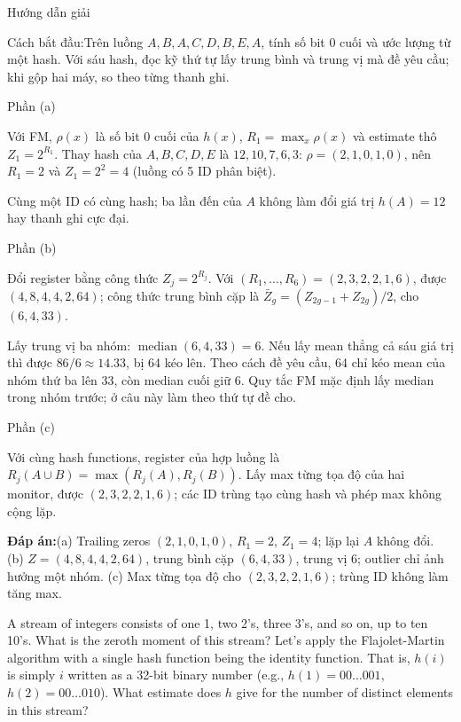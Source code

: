 \documentclass[10pt,a4paper,twocolumn]{article}
\makeatletter
\newcommand{\maptag}[1]{\phantomsection\@bsphack\protected@write\@auxout{}{\string\newlabel{#1}{{}{\thepage}{}{\@currentHref}{}}}\@esphack}
\newcommand{\key}[1]{#1:\enspace}
\newcommand{\solutionprompt}[1]{\par\addvspace{1pt}\noindent\key{Cách bắt đầu}#1\par\addvspace{2pt}}
\newcommand{\blocklabel}[1]{\par\noindent#1\par\nobreak}
\newcommand{\answer}[1]{%
  \par\addvspace{3pt}%
  \blocklabel{#1Hướng dẫn giải}}
\newcommand{\finalanswer}[1]{%
  \par\addvspace{3pt}\noindent\textbf{Đáp án:}\nobreak\enspace#1\par}
\newcommand{\guidepart}[1]{%
  \par\addvspace{1.5pt}%
  \blocklabel{Phần #1}}
\makeatother
\begin{document}
\answer{\maptag{answer:Pr24}}
\solutionprompt{Trên luồng $A,B,A,C,D,B,E,A$, tính số bit 0 cuối và ước lượng từ một hash. Với sáu hash, đọc kỹ thứ tự lấy trung bình và trung vị mà đề yêu cầu; khi gộp hai máy, so theo từng thanh ghi.}
\guidepart{(a)}
\begin{guidesteps}
\item Với FM, $\rho(x)$ là số bit 0 cuối của $h(x)$, $R_1=\max_x\rho(x)$ và estimate thô $Z_1=2^{R_1}$. Thay hash của $A,B,C,D,E$ là $12,10,7,6,3$: $\rho=(2,1,0,1,0)$, nên $R_1=2$ và $Z_1=2^2=4$ (luồng có 5 ID phân biệt).
\item Cùng một ID có cùng hash; ba lần đến của $A$ không làm đổi giá trị $h(A)=12$ hay thanh ghi cực đại.
\end{guidesteps}
\guidepart{(b)}
\begin{guidesteps}
\item Đổi register bằng công thức $Z_j=2^{R_j}$. Với $(R_1,\ldots,R_6)=(2,3,2,2,1,6)$, được $(4,8,4,4,2,64)$; công thức trung bình cặp là $\bar Z_g=(Z_{2g-1}+Z_{2g})/2$, cho $(6,4,33)$.
\item Lấy trung vị ba nhóm: $\operatorname{median}(6,4,33)=6$. Nếu lấy mean thẳng cả sáu giá trị thì được $86/6\approx14.33$, bị 64 kéo lên. Theo cách đề yêu cầu, 64 chỉ kéo mean của nhóm thứ ba lên 33, còn median cuối giữ 6. Quy tắc FM mặc định lấy median trong nhóm trước; ở câu này làm theo thứ tự đề cho.
\end{guidesteps}
\guidepart{(c)}
\begin{guidesteps}
\item Với cùng hash functions, register của hợp luồng là $R_j(A\cup B)=\max(R_j(A),R_j(B))$. Lấy max từng tọa độ của hai monitor, được $(2,3,2,2,1,6)$; các ID trùng tạo cùng hash và phép max không cộng lặp.
\end{guidesteps}
\finalanswer{(a) Trailing zeros $(2,1,0,1,0)$, $R_1=2$, $Z_1=4$; lặp lại $A$ không đổi. (b) $Z=(4,8,4,4,2,64)$, trung bình cặp $(6,4,33)$, trung vị $6$; outlier chỉ ảnh hưởng một nhóm. (c) Max từng tọa độ cho $(2,3,2,2,1,6)$; trùng ID không làm tăng max.}

A stream of integers consists of one 1, two 2's, three 3's, and so on, up to ten 10's.
 What is the zeroth moment of this stream?
 Let's apply the Flajolet-Martin algorithm with a single hash function being the identity function. That is, $h(i)$ is simply $i$ written as a 32-bit binary number (e.g., $h(1)=00\ldots001$, $h(2)=00\ldots010$). What estimate does $h$ give for the number of distinct elements in this stream?
\end{document}
